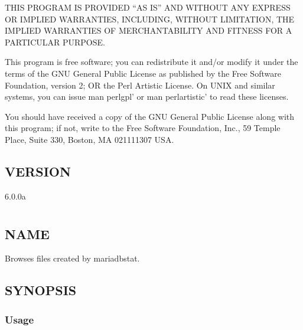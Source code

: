 \documentclass[letterpaper,10pt,english]{sphinxmanual}
\begin{document}
\sphinxAtStartPar
THIS PROGRAM IS PROVIDED “AS IS” AND WITHOUT ANY EXPRESS OR IMPLIED
WARRANTIES, INCLUDING, WITHOUT LIMITATION, THE IMPLIED WARRANTIES OF
MERCHANTABILITY AND FITNESS FOR A PARTICULAR PURPOSE.

\sphinxAtStartPar
This program is free software; you can redistribute it and/or modify it under
the terms of the GNU General Public License as published by the Free Software
Foundation, version 2; OR the Perl Artistic License.  On UNIX and similar
systems, you can issue \textasciigrave{}man perlgpl’ or \textasciigrave{}man perlartistic’ to read these
licenses.

\sphinxAtStartPar
You should have received a copy of the GNU General Public License along with
this program; if not, write to the Free Software Foundation, Inc., 59 Temple
Place, Suite 330, Boston, MA  02111\sphinxhyphen{}1307  USA.


\section{VERSION}
\label{\detokenize{mariadb-stat:version}}
\sphinxAtStartPar
{} 6.0.0a


\chapter{}
\label{\detokenize{mariadb-stat-browser:mariadb-stat-browser}}\label{\detokenize{mariadb-stat-browser::doc}}

\section{NAME}
\label{\detokenize{mariadb-stat-browser:name}}
\sphinxAtStartPar
{} \sphinxhyphen{} Browses files created by mariadb\sphinxhyphen{}stat.


\section{SYNOPSIS}
\label{\detokenize{mariadb-stat-browser:synopsis}}

\subsection{Usage}
\label{\detokenize{mariadb-stat-browser:usage}}
\begin{sphinxVerbatim}[commandchars=\\\{\}]
 
\end{sphinxVerbatim}
\end{document}
